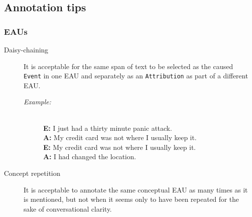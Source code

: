\documentclass[a4paper,12pt]{article}
\begin{document}
    \subsection{Annotation tips}

    \subsubsection{EAUs}
    \begin{description}
        \item[Daisy-chaining] It is acceptable for the same span of text to be selected as the caused \texttt{Event} in one EAU and separately as an \texttt{Attribution} as part of a different EAU.
            \begin{description}
                \item[\emph{Example:}]\mbox{}\\
                \textbf{E:} I just had a thirty minute panic attack.\\ 
                \textbf{A:} My credit card was not where I usually keep it.\\
                \textbf{E:} My credit card was not where I usually keep it.\\
                \textbf{A:} I had changed the location.
            \end{description}
    \end{description}
    \begin{description}
        \item[Concept repetition] It is acceptable to annotate the same conceptual EAU as many times as it is mentioned, but not when it seems only to have been repeated for the sake of conversational clarity.
    \end{description}
\end{document}
